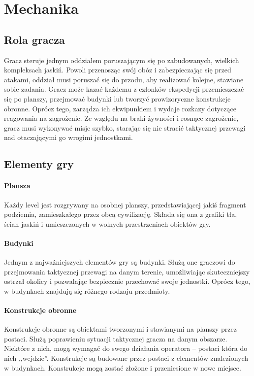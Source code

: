 \documentclass[licencjacka]{pracamgr}
\begin{document}
  \section{Mechanika}
    \subsection{Rola gracza}
    Gracz steruje jednym oddziałem poruszającym się po zabudowanych, wielkich kompleksach jaskiń. Powoli przenosząc
    swój obóz i zabezpieczając się przed atakami, oddział musi poruszać się do przodu, aby realizować kolejne, stawiane
    sobie zadania. Gracz może kazać każdemu z członków ekspedycji przemieszczać się po planszy, przejmować budynki lub
    tworzyć prowizoryczne konstrukcje obronne. Oprócz tego, zarządza ich ekwipunkiem i wydaje rozkazy dotyczące reagowania
    na zagrożenie. Ze względu na braki żywności i rosnące zagrożenie, gracz musi wykonywać misje szybko, starając się
    nie stracić taktycznej przewagi nad otaczającymi go wrogimi jednostkami.

    \subsection{Elementy gry}
    \paragraph{Plansza}
      Każdy level jest rozgrywany na osobnej planszy, przedstawiającej jakiś fragment podziemia, zamieszkałego przez
      obcą cywilizację. Składa się ona z grafiki tła, ścian jaskiń i umieszczonych w wolnych przestrzeniach obiektów gry.
    \paragraph{Budynki}
      Jednym z najważniejszych elementów gry są budynki. Służą one graczowi do przejmowania taktycznej przewagi na danym
      terenie, umożliwiając skuteczniejszy ostrzał okolicy i pozwalając bezpiecznie przechować swoje jednostki. Oprócz tego,
      w budynkach znajdują się różnego rodzaju przedmioty.
    \paragraph{Konstrukcje obronne}
      Konstrukcje obronne są obiektami tworzonymi i stawianymi na planszy przez postaci. Służą poprawieniu sytuacji
      taktycznej gracza na danym obszarze. Niektóre z nich, mogą wymagać do swego działania operatora – postaci która
      do nich ,,wejdzie''. Konstrukcje są budowane przez postaci z elementów znalezionych w budynkach. Konstrukcje mogą
      zostać złożone i przeniesione w nowe miejsce.
\end{document}
